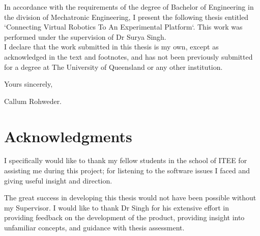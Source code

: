 \documentclass[12pt,openany,a4paper]{book}
\begin{document}
In accordance with the requirements of the degree of Bachelor of
Engineering in the division of 
Mechatronic Engineering,
I present the
following thesis entitled `Connecting Virtual Robotics To An Experimental Platform`.  This work was performed under the supervision of Dr Surya Singh.\\

I declare that the work submitted in this thesis is my own, except as
acknowledged in the text and footnotes, and has not been previously
submitted for a degree at The University of Queensland or any other
institution.

\begin{flushright}
	Yours sincerely,\\
	\medskip

	\medskip
	Callum Rohweder.
\end{flushright}

\cleardoublepage

\chapter{Acknowledgments}

I specifically would like to thank my fellow students in the school of ITEE for assisting me during this project; for listening to the software issues I faced and giving useful insight and direction.

The great success in developing this thesis would not have been possible without my Supervisor. I would like to thank Dr Singh for his extensive effort in providing feedback on the development of the product, providing insight into unfamiliar concepts, and guidance with thesis assessment.

\cleardoublepage
\end{document}
